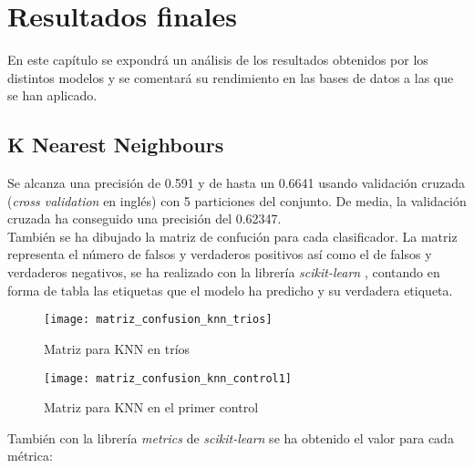
\chapter{Resultados finales}
En este capítulo se expondrá un análisis de los resultados obtenidos por los distintos modelos y se comentará su rendimiento en las bases de datos a las que se han aplicado.

\section{K Nearest Neighbours}
Se alcanza una precisión de 0.591 y de hasta un 0.6641 usando validación cruzada (\textit{cross validation} en inglés) con 5 particiones del conjunto. De media, la validación cruzada ha conseguido una precisión del 0.62347.\\
También se ha dibujado \cite{Hunter:2007} la matriz de confución para cada clasificador. La matriz representa el número de falsos y verdaderos positivos así como el de falsos y verdaderos negativos, se ha realizado con la librería \textit{scikit-learn} \cite{scikit2021metrics}, contando en forma de tabla las etiquetas que el modelo ha predicho y su verdadera etiqueta.

\begin{figure}[H]
\centering
\begin{minipage}[t]{.5\textwidth}
  \texttt{[image: matriz\_confusion\_knn\_trios]}
  \caption{Matriz para KNN en tríos}
  \label{fig:confusion-knn-trios}
\end{minipage}%
\begin{minipage}[t]{.5\textwidth}
  \texttt{[image: matriz\_confusion\_knn\_control1]}
  \caption{Matriz para KNN en el primer control}
  \label{fig:confusion-knn-control1}
\end{minipage}
\end{figure}

También con la librería \textit{metrics} de \textit{scikit-learn} se ha obtenido el valor para cada métrica:


